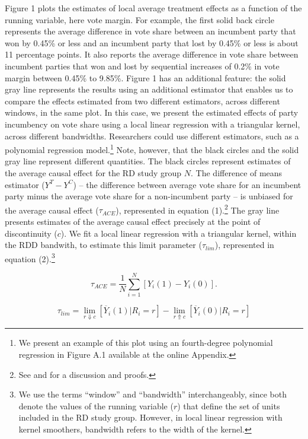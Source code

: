 \documentclass[letterpaper,twoside,12pt]{article}\usepackage[]{graphicx}\usepackage[]{color}
\begin{document}
Figure 1 plots the estimates of local average treatment effects as a function of the running variable, here vote margin. For example, the first solid back circle represents the average difference in vote share between an incumbent party that won by 0.45\% or less and an incumbent party that lost by 0.45\% or less is about 11 percentage points. It also reports the average difference in vote share between incumbent parties that won and lost by sequential increases of 0.2\% in vote margin between 0.45\% to 9.85\%. Figure 1 has an additional feature: the solid gray line represents the results using an additional estimator that enables us to compare the effects estimated from two different estimators, across different windows, in the same plot. In this case, we present the estimated effects of party incumbency on vote share using a local linear regression with a triangular kernel, across different bandwidths. Researchers could use different estimators, such as a polynomial regression model.\footnote{We present an example of this plot using an fourth-degree polynomial regression in Figure A.1 available at the online Appendix.} Note, however, that the black circles and the solid gray line represent different quantities. The black circles represent estimates of the average causal effect for the RD study group $N$. The difference of means estimator ($Y^T - Y^C$) -- the difference between average vote share for an incumbent party minus the average vote share for a non-incumbent party -- is unbiased for the average causal effect ($\tau_{ACE}$), represented in equation (1).\footnote{See \citet{dunning2012natural} and \citet{buenodunningtunon2014} for a discussion and proofs.} The gray line presents estimates of the average causal effect precisely at the point of discontinuity ($c$). We fit a local linear regression with a triangular kernel, within the RDD bandwith, to estimate this limit parameter ($\tau_{lim}$), represented in equation (2).\footnote{We use the terms ``window'' and ``bandwidth'' interchangeably, since both denote the values of the running variable ($r$) that define the set of units included in the RD study group. However, in local linear regression with kernel smoothers, bandwidth refers to the width of the kernel.}

\begin{equation}\label{local_parameter}
\tau_{ACE} = \frac{1}{N}\sum_{i=1}^{N} [Y_{i}(1)-Y_{i}(0)].
\end{equation}

\begin{equation}\label{limit_parameter}
\tau_{lim} =  \lim_{r \Downarrow c}  [\overline{Y}_i(1)|R_i=r] - \lim_{r \Uparrow c} [\overline{Y}_i(0)|R_i=r]
  \end{equation}
\end{document}
